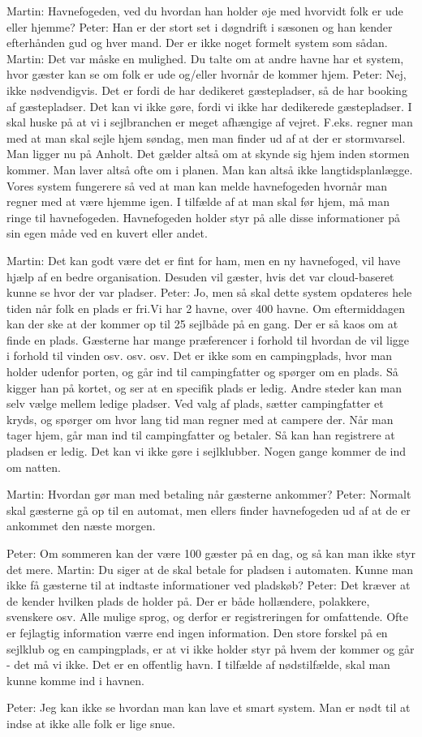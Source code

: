 Martin: Havnefogeden, ved du hvordan han holder øje med hvorvidt folk er ude eller hjemme?
Peter: Han er der stort set i døgndrift i sæsonen og han kender efterhånden gud og hver mand. Der er ikke noget formelt system som sådan.
Martin: Det var måske en mulighed. Du talte om at andre havne har et system, hvor gæster kan se om folk er ude og/eller hvornår de kommer hjem.
Peter: Nej, ikke nødvendigvis. Det er fordi de har dedikeret gæstepladser, så de har booking af gæstepladser. Det kan vi ikke gøre, fordi vi ikke har dedikerede gæstepladser. I skal huske på at vi i sejlbranchen er meget afhængige af vejret. F.eks. regner man med at man skal sejle hjem søndag, men man finder ud af at der er stormvarsel. Man ligger nu på Anholt. Det gælder altså om at skynde sig hjem inden stormen kommer. Man laver altså ofte om i planen. Man kan altså ikke langtidsplanlægge. Vores system fungerere så ved at man kan melde havnefogeden hvornår man regner med at være hjemme igen. I tilfælde af at man skal før hjem, må man ringe til havnefogeden. Havnefogeden holder styr på alle disse informationer på sin egen måde ved en kuvert eller andet.

Martin: Det kan godt være det er fint for ham, men en ny havnefoged, vil have hjælp af en bedre organisation. Desuden vil gæster, hvis det var cloud-baseret kunne se hvor der var pladser.
Peter: Jo, men så skal dette system opdateres hele tiden når folk en plads er fri.Vi har 2 havne, over 400 havne. Om eftermiddagen kan der ske at der kommer op til 25 sejlbåde på en gang. Der er så kaos om at finde en plads. Gæsterne har mange præferencer i forhold til hvordan de vil ligge i forhold til vinden osv. osv. osv. Det er ikke som en campingplads, hvor man holder udenfor porten, og går ind til campingfatter og spørger om en plads. Så kigger han på kortet, og ser at en specifik plads er ledig. Andre steder kan man selv vælge mellem ledige pladser. Ved valg af plads, sætter campingfatter et kryds, og spørger om hvor lang tid man regner med at campere der. Når man tager hjem, går man ind til campingfatter og betaler. Så kan han registrere at pladsen er ledig. Det kan vi ikke gøre i sejlklubber. Nogen gange kommer de ind om natten.

Martin: Hvordan gør man med betaling når gæsterne ankommer?
Peter: Normalt skal gæsterne gå op til en automat, men ellers finder havnefogeden ud af at de er ankommet den næste morgen.

Peter: Om sommeren kan der være 100 gæster på en dag, og så kan man ikke styr det mere.
Martin: Du siger at de skal betale for pladsen i automaten. Kunne man ikke få gæsterne til at indtaste informationer ved pladskøb? 
Peter: Det kræver at de kender hvilken plads de holder på. Der er både hollændere, polakkere, svenskere osv. Alle mulige sprog, og derfor er registreringen for omfattende. Ofte er fejlagtig information værre end ingen information. Den store forskel på en sejlklub og en campingplads, er at vi ikke holder styr på hvem der kommer og går - det må vi ikke. Det er en offentlig havn. I tilfælde af nødstilfælde, skal man kunne komme ind i havnen.

Peter: Jeg kan ikke se hvordan man kan lave et smart system. Man er nødt til at indse at ikke alle folk er lige snue.